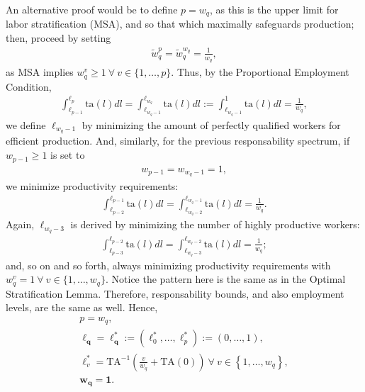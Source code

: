 \documentclass[hidelinks, nonatbib]{elsarticle}
\begin{document}
An alternative proof would be to define $p = w_q$, as this is the upper limit for labor stratification (MSA), and so that which maximally safeguards production; then, proceed by setting 
\begin{gather}
\tilde{w}_{q}^{p} 
= 
\tilde{w}_{q}^{w_q} 
= 
\frac{1}{w_q}
,
\end{gather}
as MSA implies $w_{q}^{v} \geq 1 \ \forall \ v \in \{1, \dots, p\}$. Thus, by the Proportional Employment Condition, 
\begin{gather}
\int_{
    \ell_{p-1}
}^{
    \ell_{p}
}{
    \text{ta}(l)dl
}
=
\int_{
    \ell_{w_q-1}
}^{
    \ell_{w_q}
}{
    \text{ta}(l)dl
}
:=
\int_{
    \ell_{w_q-1}
}^{1}{
    \text{ta}(l)dl
}
=
\frac{1}{w_q}
,
\end{gather}
we define $\ell_{w_q - 1}$ by minimizing the amount of perfectly qualified workers for efficient production. And, similarly, for the previous responsability spectrum, if $w_{p-1} \geq 1$ is set to 
\begin{gather}
w_{p-1} = w_{w_q - 1} = 1
,
\end{gather}
we minimize productivity requirements:
\begin{gather}
\int_{
    \ell_{p-2}
}^{
    \ell_{p-1}
}{
    \text{ta}(l)dl
}
=
\int_{
    \ell_{w_q-2}
}^{
    \ell_{w_q-1}
}{
    \text{ta}(l)dl
}
=
\frac{1}{w_q}
.
\end{gather}
Again, $\ell_{w_q - 3}$ is derived by minimizing the number of highly productive workers:
\begin{gather}
\int_{
    \ell_{p-3}
}^{
    \ell_{p-2}
}{
    \text{ta}(l)dl
}
=
\int_{
    \ell_{w_q-3}
}^{
    \ell_{w_q-2}
}{
    \text{ta}(l)dl
}
=
\frac{1}{w_q}
;
\end{gather}
and, so on and so forth, always minimizing productivity requirements with $w_{q}^{v} = 1 \ \forall \ v \in \{1, \dots, w_q\}$. Notice the pattern here is the same as in the Optimal Stratification Lemma. Therefore, responsability bounds, and also employment levels, are the same as well. Hence,
\begin{gather}
p = w_q,
\\
\boldsymbol{\ell_q} = 
\boldsymbol{\ell_{q}^{*}}
:=
(
    \ell_{0}^{*}
    ,
    \dots
    ,
    \ell_{p}^{*}
)
:=
(
    0
    ,
    \dots
    ,
    1
)
,
\\
\ell_{v}^{*}
=
\text{TA}^{-1}\left(
    \frac{v}{w_q}
    +
    \text{TA}(0)
\right)
\
\forall
\
v \in 
\left\{
    1, \dots, w_q
\right\}
,
\\
\boldsymbol{w_q} =
\boldsymbol{1}
.
\end{gather}
\end{document}
